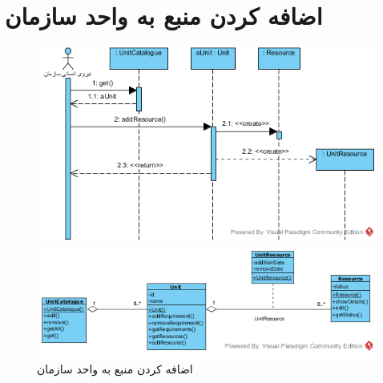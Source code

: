 \section{اضافه کردن منبع به واحد سازمان}
\begin{figure}[H]
	\centering
	\includegraphics[scale=0.9]{img/sequence-analysis/AddResourceToUnit}
	
	
	
	\includegraphics[scale=0.9]{img/sequence-analysis/AddResourceToUnitC}	
	\caption{اضافه کردن منبع به واحد سازمان}
\end{figure}

